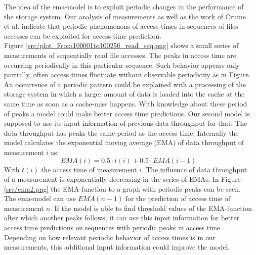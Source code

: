 \documentclass{superfri}
\begin{document}
The idea of the ema-model is to exploit periodic changes in the performance of the storage system.
Our analysis of measurements as well as the work of Crume et al. \cite{Crume:2013:FML:2538542.2538561} indicate that periodic phenomenons of access times in sequences of files accesses can be exploited for access time prediction.\\
Figure \ref{src/plot_From100001to100250_read_seq.png} shows a small series of measurements of sequentially read file accesses.
The peaks in access time are occurring periodically in this particular sequence. Such behavior appears only partially, often access times fluctuate without observable periodicity as in Figure.
An occurrence of a periodic pattern could be explained with a processing of the storage system in which a larger amount of data is loaded into the cache at the same time as soon as a cache-miss happens.
With knowledge about these period of peaks a model could make better access time predictions.
Our second model is supposed to use its input information of previous data throughput for that.
The data throughput has peaks the same period as the access time.
Internally the model calculates the exponential moving average (EMA) of data throughput of measurement $i$ as:
\begin{equation}
EMA(i) = 0.5 \cdot t(i)+ 0.5 \cdot EMA(i-1)
\end{equation}
With $t(i)$ the access time of measurement $i$.
The influence of data throughput of a measurement is exponentially decreasing in the series of EMAs.
In Figure \ref{src/ema2.png} the EMA-function to a graph with periodic peaks can be seen.
\\
The ema-model can use $EMA(n-1)$ for the prediction of access time of measurement $n$.
If the model is able to find threshold values of the EMA-function after which another peaks follows, it can use this input information for better access time predictions on sequences with periodic peaks in access time. Depending on how relevant periodic behavior of access times is in our measurements, this additional input information could improve the model.

\end{document}
